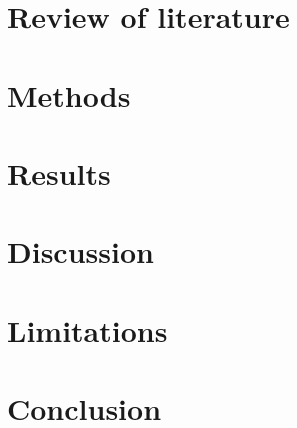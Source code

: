 \documentclass{report}
\begin{document}
\chapter{Review of literature}

\chapter{Methods}

\chapter{Results}

\chapter{Discussion}

\chapter{Limitations}

\chapter{Conclusion}


\end{document}
